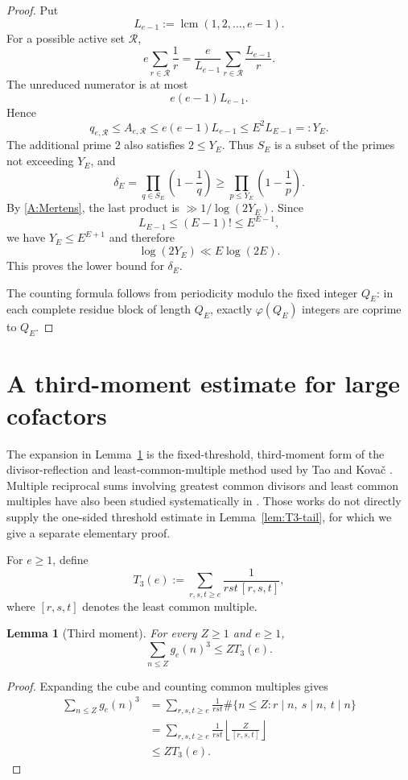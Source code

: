 \documentclass[11pt]{article}
\newtheorem{lemma}[theorem]{Lemma}
\theoremstyle{definition}
\theoremstyle{remark}
\begin{document}
\begin{proof}
Put
\[
L_{e-1}:=\operatorname{lcm}(1,2,\ldots,e-1).
\]
For a possible active set $\mathcal R$,
\[
e\sum_{r\in\mathcal R}\frac1r
=\frac e{L_{e-1}}
\sum_{r\in\mathcal R}\frac{L_{e-1}}r.
\]
The unreduced numerator is at most
\[
e(e-1)L_{e-1}.
\]
Hence
\[
q_{e,\mathcal R}\leq A_{e,\mathcal R}
\leq e(e-1)L_{e-1}
\leq E^2L_{E-1}=:Y_E.
\]
The additional prime $2$ also satisfies $2\leq Y_E$.  Thus $S_E$ is a subset of the primes not exceeding $Y_E$, and
\[
\delta_E
=\prod_{q\in S_E}\left(1-\frac1q\right)
\geq
\prod_{p\leq Y_E}\left(1-\frac1p\right).
\]
By \ref{A:Mertens}, the last product is $\gg1/\log(2Y_E)$.  Since
\[
L_{E-1}\leq(E-1)!\leq E^{E-1},
\]
we have $Y_E\leq E^{E+1}$ and therefore
\[
\log(2Y_E)\ll E\log(2E).
\]
This proves the lower bound for $\delta_E$.

The counting formula follows from periodicity modulo the fixed integer $Q_E$: in each complete residue block of length $Q_E$, exactly $\varphi(Q_E)$ integers are coprime to $Q_E$.
\end{proof}

\section{A third-moment estimate for large cofactors}

The expansion in Lemma~\ref{lem:third-moment} is the fixed-threshold,
third-moment form of the divisor-reflection and least-common-multiple
method used by Tao and Kova\v{c} \cite{TaoComment,Kovac}.  Multiple
reciprocal sums involving greatest common divisors and least common
multiples have also been studied systematically in
\cite{HilberdinkLucaToth,KimLCM}.  Those works do not directly supply
the one-sided threshold estimate in Lemma~\ref{lem:T3-tail}, for which
we give a separate elementary proof.

For $e\geq1$, define
\[
T_3(e):=\sum_{r,s,t\geq e}
\frac1{rst\,[r,s,t]},
\]
where $[r,s,t]$ denotes the least common multiple.

\begin{lemma}[Third moment]\label{lem:third-moment}
For every $Z\geq1$ and $e\geq1$,
\[
\sum_{n\leq Z}g_e(n)^3\leq ZT_3(e).
\]
\end{lemma}

\begin{proof}
Expanding the cube and counting common multiples gives
\begin{align*}
\sum_{n\leq Z}g_e(n)^3
&=
\sum_{r,s,t\geq e}\frac1{rst}
\#\{n\leq Z:r\mid n,\ s\mid n,\ t\mid n\}\\
&=
\sum_{r,s,t\geq e}\frac1{rst}
\left\lfloor\frac{Z}{[r,s,t]}\right\rfloor\\
&\leq ZT_3(e).
\end{align*}
\end{proof}
\end{document}
